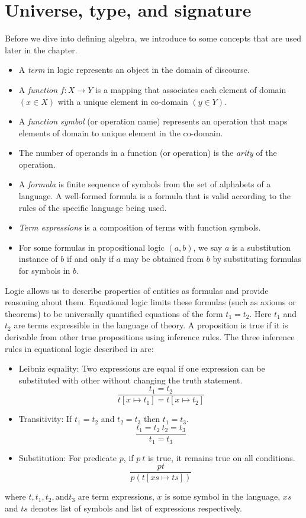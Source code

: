 \section{Universe, type, and signature}
Before we dive into defining algebra, we introduce to some concepts that are
used later in the chapter.
\begin{itemize}
    \item  A \emph{term} in logic represents an object in the domain of
    discourse.
    \item  A \emph{function} $f: X \rightarrow Y$ is a mapping that associates each
    element of domain $(x \in X)$ with a unique element in co-domain $(y \in Y)$.
    \item  A \emph{function symbol} (or operation name) represents an operation
    that maps elements of domain to unique element in the co-domain.
    \item The number of operands in a function (or operation) is the \emph{arity} of
    the operation.
    \item A \emph{formula} is finite sequence of symbols from the set of alphabets of a
    language. A well-formed formula is a formula that is valid according
    to the rules of the specific  language being used.
    \item \emph{Term expressions} is a composition of terms with function symbols.
    \item For some formulas in propositional logic $(a,b)$, we say $a$ is a
    substitution instance of $b$ if and only if $a$ may be obtained from $b$ by
    substituting formulas for symbols in $b$.
\end{itemize}

\label{universe}
Logic allows us to describe properties of entities as formulas and provide
reasoning about them. Equational logic limits these formulas (such as axioms
or theorems) to  be universally quantified equations of the form $t_1 = t_2$.
Here $t_1$ and $t_2$ are terms expressible in the language of theory. A
proposition is true if it is derivable from other true propositions using
inference rules. The three inference rules in equational logic described in
\cite{gries2013logical} are:
\begin{itemize}
    \item Leibniz equality: Two expressions are equal if one expression can be
    substituted with other without changing the truth statement. \[\frac{t_1
    = t_2}{t[x \mapsto t_1] = t[x \mapsto t_2]}\]
    \item Transitivity: If $t_1 = t_2$ and $t_2 = t_3$ then $t_1 = t_3$.
    \[{\frac{t_1 = t_2\ t_2 = t_3}{t_1 = t_3}}\]
    \item Substitution: For predicate $p$, if $p\ t$ is true, it remains true on all
    conditions. \[\frac{p t}{p(t[xs \mapsto ts])}\]
\end{itemize}
where $t,t_1,t_2, \text{and} t_3$ are term expressions, $x$ is some symbol in the
language, $xs$ and $ts$ denotes list of symbols and list of expressions
respectively. 

